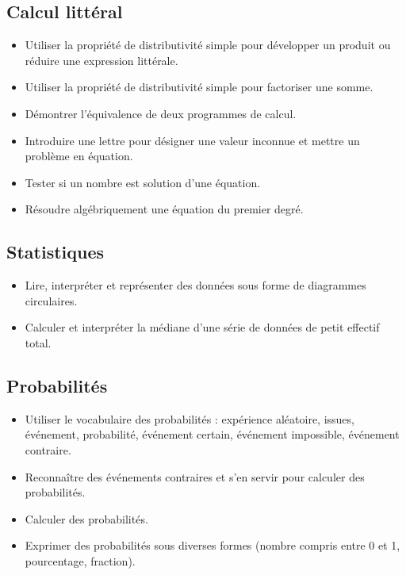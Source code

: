 \documentclass[a4paper,12pt,fleqn]{article}
\begin{document}
\subsection*{Calcul littéral}

\begin{itemize}[itemsep=1em]
	\item {}Utiliser la propriété de distributivité simple pour développer un produit ou réduire une expression littérale.
	\item {}Utiliser la propriété de distributivité simple pour factoriser une somme.
	\item {}Démontrer l’équivalence de deux programmes de calcul.
	\item {}Introduire une lettre pour désigner une valeur inconnue et mettre un problème en équation.
	\item {}Tester si un nombre est solution d’une équation.
	\item {}Résoudre algébriquement une équation du premier degré.
\end{itemize}

\newpage


\subsection*{Statistiques}

\begin{itemize}[itemsep=1em]
	\item {}Lire, interpréter et représenter des données sous forme de diagrammes circulaires.
	\item {}Calculer et interpréter la médiane d’une série de données de petit effectif total.
\end{itemize}

\subsection*{Probabilités}

\begin{itemize}[itemsep=1em]
	\item {}Utiliser le vocabulaire des probabilités : expérience aléatoire, issues, événement, probabilité, événement certain, événement impossible, événement contraire.
	\item {}Reconnaître des événements contraires et s’en servir pour calculer des probabilités.
	\item {}Calculer des probabilités.
	\item {}Exprimer des probabilités sous diverses formes (nombre compris entre 0 et 1, pourcentage, fraction).
\end{itemize}
\end{document}

